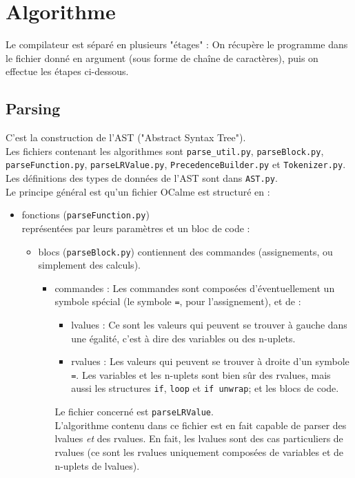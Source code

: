 \documentclass[french]{article}
\begin{document}
\section{Algorithme}

Le compilateur est séparé en plusieurs "étages" :
On récupère le programme dans le fichier donné en argument (sous forme de
chaîne de caractères), puis on effectue les étapes ci-dessous.

\subsection{Parsing}

C'est la construction de l'AST ("Abstract Syntax Tree"). \\
Les fichiers contenant les algorithmes sont \verb|parse_util.py|, \verb|parseBlock.py|,
\verb|parseFunction.py|, \verb|parseLRValue.py|, \verb|PrecedenceBuilder.py|
et \verb|Tokenizer.py|. \\
Les définitions des types de données de l'AST sont dans \verb|AST.py|. \\
Le principe général est qu'un fichier OCalme est structuré en :
\begin{itemize}
 \item{fonctions (\verb|parseFunction.py|)} \\
 représentées par leurs paramètres et un bloc de code :
 \begin{itemize}
 \item blocs (\verb|parseBlock.py|)
   contiennent des commandes (assignements, ou simplement des calculs).
   \begin{itemize}
   \item{commandes :} Les commandes sont composées d'éventuellement un symbole
     spécial (le symbole \verb|=|, pour l'assignement), et de :
     \begin{itemize}
     \item{lvalues :} Ce sont les valeurs qui peuvent se trouver à gauche dans
       une égalité, c'est à dire des variables ou des n-uplets.
     \item{rvalues :} Les valeurs qui peuvent se trouver à droite d'un symbole
       \verb|=|. Les variables et les n-uplets sont bien sûr des rvalues, mais
       aussi les structures \verb|if|, \verb|loop| et \verb|if unwrap|; et les blocs de
       code.
     \end{itemize}
     Le fichier concerné est \verb|parseLRValue|. \\
     L'algorithme contenu dans ce fichier est en fait capable de parser
     des lvalues \emph{et} des rvalues. En fait, les lvalues sont des cas
     particuliers de rvalues (ce sont les rvalues uniquement composées
     de variables et de n-uplets de lvalues).
   \end{itemize}
  \end{itemize}
\end{itemize}
\end{document}
